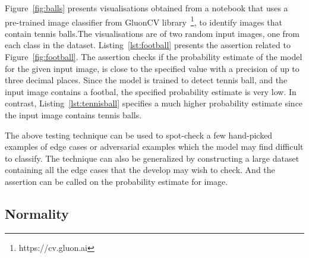 \documentclass[acmsmall,screen,review,anonymous]{acmart}
\begin{document}
Figure~\ref{fig:balls} presents visualisations obtained from a notebook that uses a pre-trained image classifier from GluonCV library~\footnote{https://cv.gluon.ai}, to identify images that contain tennis balls.The visualisations are of two random input images, one from each class in the dataset. Listing~\ref{lst:football} presents the assertion related to Figure~\ref{fig:football}. The assertion checks if the probability estimate of the model for the given input image, is close to the specified value with a precision of up to three decimal places. Since the model is trained to detect tennis ball, and the input image contains a footbal, the specified probability estimate is very low. In contrast, Listing~\ref{lst:tennisball} specifies a much higher probability estimate since the input image contains tennis balls.

The above testing technique can be used to spot-check a few hand-picked examples of edge cases or adversarial examples which the model may find difficult to classify. The technique can also be generalized by constructing a large dataset containing all the edge cases that the develop may wish to check. And the assertion can be called on the probability estimate for image.


\subsection{Normality}\label{sec:normal}
\end{document}

